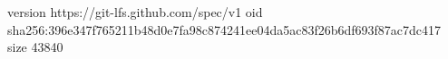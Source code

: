 version https://git-lfs.github.com/spec/v1
oid sha256:396e347f765211b48d0e7fa98c874241ee04da5ac83f26b6df693f87ac7dc417
size 43840
